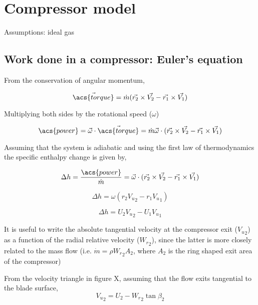 \documentclass[tcc]{subfiles}
\begin{document}
\chapter{Compressor model}

Assumptions: ideal gas

\section{Work done in a compressor: Euler's equation}
\label{sec:euler_equation}

From the conservation of angular momentum, 

\begin{equation}
    \vec{\acs{torque}} = \dot{m} (\vec{r_2}\cross\vec{V_2} - \vec{r_1}\cross\vec{V_1}) 
\end{equation}

Multiplying both sides by the rotational speed ($\omega$)

\begin{equation}
    \acs{power} = \vec{\omega}\cdot\vec{\acs{torque}} 
                = \dot{m} \vec{\omega} \cdot (\vec{r_2}\cross\vec{V_2} - \vec{r_1}\cross\vec{V_1}) 
\end{equation}

Assuming that the system is adiabatic and using the first law of thermodynamics the specific enthalpy change is given by,

\begin{equation}
    \Delta h = \frac{\acs{power}}{\dot{m}} 
             = \vec{\omega} \cdot (\vec{r_2}\cross\vec{V_2} - \vec{r_1}\cross\vec{V_1}) 
\end{equation}

\begin{equation}
    \Delta h = \omega (r_2 {V_u}_2 - r_1 {V_u}_1) 
\end{equation}

\begin{equation}
    \label{eqn:euler}
    \Delta h = U_2 {V_u}_2 - U_1 {V_u}_1 
\end{equation}

It is useful to write the absolute tangential velocity at the compressor exit (${V_u}_2$)
as a function of the radial relative velocity (${W_r}_2$),
since the latter is more closely related to the mass flow 
(i.e. $\dot{m} = \rho {W_r}_2 A_2$, where $A_2$ is the ring shaped exit area of the compressor)

From the velocity triangle in figure X, assuming that the flow exits tangential to the blade surface,
\begin{equation}
    \label{eqn:V_u_2}
    {V_u}_2 = U_2 - {W_r}_2 \tan\beta_2
\end{equation}
\end{document}
